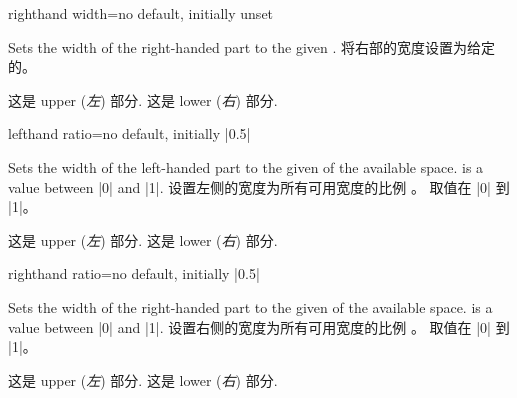 \enlargethispage*{1cm}
\begin{docTcbKey}{righthand width}{=}{no default, initially unset}
\begin{stripedbox}
Sets the width of the right-handed part to the given .
\tcblower
将右部的宽度设置为给定的。
\end{stripedbox}

\begin{dispExample}

\begin{tcolorbox}[title=My title,sidebyside,righthand width=3cm]
这是 upper (\textit{左}) 部分.
\tcblower
这是 lower (\textit{右}) 部分.
\end{tcolorbox}
\end{dispExample}
\end{docTcbKey}

\begin{docTcbKey}{lefthand ratio}{=}{no default, initially |0.5|}
\begin{stripedbox}
Sets the width of the left-handed part to the given  of
the available space.  is a value between |0| and |1|.
\tcblower
设置左侧的宽度为所有可用宽度的比例 。
 取值在 |0| 到 |1|。
\end{stripedbox}

\begin{dispExample}

\begin{tcolorbox}[title=My title,sidebyside,lefthand ratio=0.25]
这是 upper (\textit{左}) 部分.
\tcblower
这是 lower (\textit{右}) 部分.
\end{tcolorbox}
\end{dispExample}
\end{docTcbKey}


\begin{docTcbKey}{righthand ratio}{=}{no default, initially |0.5|}
\begin{stripedbox}
Sets the width of the right-handed part to the given  of
the available space.  is a value between |0| and |1|.
\tcblower
设置右侧的宽度为所有可用宽度的比例 。
 取值在 |0| 到 |1|。
\end{stripedbox}

\begin{dispExample}
\begin{tcolorbox}[title=My title,sidebyside,righthand ratio=0.25]
这是 upper (\textit{左}) 部分.
\tcblower
这是 lower (\textit{右}) 部分.
\end{tcolorbox}
\end{dispExample}
\end{docTcbKey}


